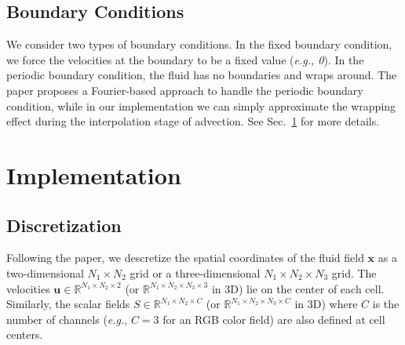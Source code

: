 \documentclass[sigconf]{acmart}
\begin{document}
\subsection{Boundary Conditions}
We consider two types of boundary conditions. In the fixed boundary condition, we force the velocities at the boundary to be a fixed value (\emph{e.g., 0}). In the periodic boundary condition, the fluid has no boundaries and wraps around. The paper proposes a Fourier-based approach to handle the periodic boundary condition, while in our implementation we can simply approximate the wrapping effect during the interpolation stage of advection. See Sec.~\ref{sec:impl} for more details.

\section{Implementation}
\label{sec:impl}
\subsection{Discretization}


Following the paper, we descretize the spatial coordinates of the fluid field $\mathbf{x}$ as a two-dimensional $N_1\times N_2$ grid or a three-dimensional $N_1\times N_2 \times N_3$ grid. The velocities $\mathbf{u} \in \mathbb{R}^{N_1\times N_2 \times 2}$ (or $\mathbb{R}^{N_1\times N_2 \times N_3 \times 3}$ in 3D) lie on the center of each cell. Similarly, the scalar fields $S \in \mathbb{R}^{N_1\times N_2 \times C}$ (or $\mathbb{R}^{N_1\times N_2 \times N_3 \times C}$ in 3D) where $C$ is the number of channels (\emph{e.g.}, $C = 3$ for an RGB color field) are also defined at cell centers.
\end{document}
